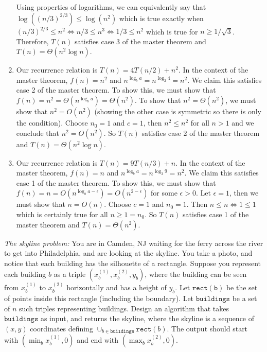 \documentclass{article}
\begin{document}
\begin{enumerate}
    Using properties of logarithms, we can equivalently say that $\log ((n/3)^{2/3}) \leq \log (n^2)$ which is true exactly when $(n/3)^{2/3} \leq n^2 \iff n/3 \leq n^3 \iff 1/3 \leq n^2$ which is true for $n \geq 1/\sqrt{3}$. \parspace
    Therefore, $T(n)$ satisfies case 3 of the master theorem and $T(n) = \Theta (n^2 \log n)$.
    \item Our recurrence relation is $T(n) = 4T(n/2) + n^2$.
    In the context of the master theorem, $f(n) = n^2$ and $n^{\log_b a} = n^{\log_2 4} = n^2$.
    We claim this satisfies case 2 of the master theorem.
    To show this, we must show that $f(n) = n^2 = \Theta (n^{\log_b a}) = \Theta (n^2)$. \parspace
    To show that $n^2 = \Theta (n^2)$, we must show that $n^2 = O(n^2)$ (showing the other case is symmetric so there is only the condition).
    Choose $n_0 = 1$ and $c = 1$, then $n^2 \leq n^2$ for all $n > 1$ and we conclude that $n^2 = O(n^2)$. \parspace
    So $T(n)$ satisfies case 2 of the master theorem and $T(n) = \Theta (n^2 \log n)$.
    \item Our recurrence relation is $T(n) = 9T(n/3) + n$.
    In the context of the master theorem, $f(n) = n$ and $n^{\log_b a} = n^{\log_3 9} = n^2$.
    We claim this satisfies case 1 of the master theorem.
    To show this, we must show that $f(n) = n = O(n^{\log_b a - \epsilon}) = O(n^{2 - \epsilon})$ for some $\epsilon > 0$. \parspace
    Let $\epsilon = 1$, then we must show that $n = O(n)$.
    Choose $c = 1$ and $n_0 = 1$.
    Then $n \leq n \iff 1 \leq 1$ which is certainly true for all $n \geq 1 = n_0$.
    So $T(n)$ satisfies case 1 of the master theorem and $T(n) = \Theta (n^2)$.
\end{enumerate}


\nextprob
{}

\emph{The skyline problem:} You are in Camden, NJ waiting for the ferry across the river to
get into Philadelphia, and are looking at the skyline.  You take a photo, and notice that each building
has the silhouette of a rectangle.  Suppose you  represent each building $b$ as a
triple $(x_b^{(1)},x_b^{(2)},y_b)$, where the building can be seen from $x_b^{(1)}$ to $x_b^{(2)}$
horizontally and has a height of $y_b$.  Let $\mathtt{rect(b)}$ be the set of
points inside this rectangle (including the boundary).  Let $\mathtt{buildings}$
be a set of $n$ such triples representing buildings. Design an algorithm that takes $\mathtt{buildings}$ as input, and
returns the skyline, where the skyline is a sequence of~$(x,y)$ coordinates
defining $\cup_{b \in \mathtt{buildings}} \mathtt{rect}(b)$.  The output should
start with $(\min_b{x_b^{(1)}},0)$ and end with $(\max_b{x_b^{(2)}},0)$.
\end{document}
